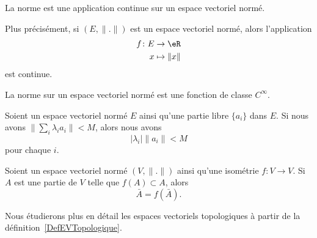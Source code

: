 \begin{proposition}     \label{PROPooYMCUooERvDpk}
	La norme est une application continue sur un espace vectoriel normé.

	Plus précisément, si \( (E,\| . \|)\) est un espace vectoriel normé, alors l'application
	\begin{equation}
		\begin{aligned}
			f\colon E & \to \eR         \\
			x         & \mapsto \| x \|
		\end{aligned}
	\end{equation}
	est continue.
\end{proposition}

\begin{proposition}     \label{PROPooQUAZooGXskwF}
	La norme sur un espace vectoriel normé est une fonction de classe \(  C^{\infty}\).
\end{proposition}

\begin{lemma}        \label{LEMooGCJEooOAynZW}
	Soient un espace vectoriel normé \( E\) ainsi qu'une partie libre \( \{ a_i \}\) dans \( E\). Si nous avons \( \| \sum_i\lambda_ia_i \|<M\), alors nous avons
	\begin{equation}
		| \lambda_i |\| a_i \|<M
	\end{equation}
	pour chaque \( i\).
\end{lemma}

\begin{lemma}       \label{LEMooSCIIooRyRrHA}
	Soient un espace vectoriel normé \( (V,\| . \|)\) ainsi qu'une isométrie \( f\colon V\to V\). Si \( A\) est une partie de \( V\) telle que \( f(A)\subset A\), alors
	\begin{equation}
		\bar A=f(\bar A).
	\end{equation}
\end{lemma}


Nous étudierons plus en détail les espaces vectoriels topologiques à partir de la définition~\ref{DefEVTopologique}.
